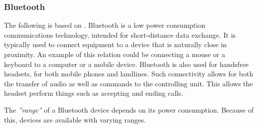 \subsubsection{Bluetooth}
The following is based on \citet{ieee_bluetooth_standard}.
Bluetooth is a low power consumption communications technology, intended for short-distance data exchange.
It is typically used to connect equipment to a device that is naturally close in proximity.
An example of this relation could be connecting a mouse or a keyboard to a computer or a mobile device.
Bluetooth is also used for handsfree headsets, for both mobile phones and landlines.
Such connectivity allows for both the transfer of audio as well as commands to the controlling unit.
This allows the headset perform things such as accepting and ending calls.

The \textit{''range''} of a Bluetooth device depends on its power consumption.
Because of this, devices are available with varying ranges.
